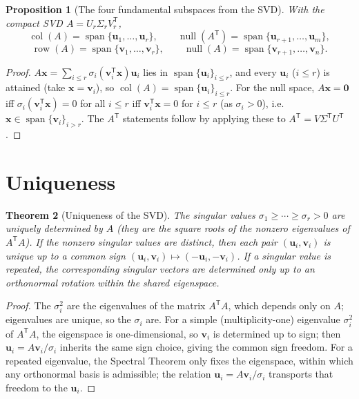 \documentclass[11pt,oneside]{book}
\theoremstyle{plain}
\newtheorem{theorem}{Theorem}[chapter]
\newtheorem{proposition}[theorem]{Proposition}
\theoremstyle{definition}
\theoremstyle{remark}
\newcommand{\col}{\operatorname{col}}
\newcommand{\row}{\operatorname{row}}
\newcommand{\nul}{\operatorname{null}}
\newcommand{\spn}{\operatorname{span}}
\newcommand{\T}{^{\mathsf T}}
\newcommand{\bu}{\mathbf{u}}
\newcommand{\bv}{\mathbf{v}}
\newcommand{\bx}{\mathbf{x}}
\newcommand{\bzero}{\mathbf{0}}
\begin{document}
\begin{proposition}[The four fundamental subspaces from the SVD]\label{prop:foursub}
With the compact SVD $A=U_r\Sigma_r V_r\T$,
\[
\col(A)=\spn\{\bu_1,\dots,\bu_r\},\qquad
\nul(A\T)=\spn\{\bu_{r+1},\dots,\bu_m\},
\]
\[
\row(A)=\spn\{\bv_1,\dots,\bv_r\},\qquad
\nul(A)=\spn\{\bv_{r+1},\dots,\bv_n\}.
\]
\end{proposition}
\begin{proof}
$A\bx=\sum_{i\le r}\sigma_i(\bv_i\T\bx)\bu_i$ lies in $\spn\{\bu_i\}_{i\le r}$, and every
$\bu_i$ ($i\le r$) is attained (take $\bx=\bv_i$), so $\col(A)=\spn\{\bu_i\}_{i\le r}$.
For the null space, $A\bx=\bzero$ iff $\sigma_i(\bv_i\T\bx)=0$ for all $i\le r$ iff
$\bv_i\T\bx=0$ for $i\le r$ (as $\sigma_i>0$), i.e.\ $\bx\in\spn\{\bv_i\}_{i>r}$. The
$A\T$ statements follow by applying these to $A\T=V\Sigma\T U\T$.
\end{proof}

\section{Uniqueness}

\begin{theorem}[Uniqueness of the SVD]\label{thm:svduniq}
The singular values $\sigma_1\ge\cdots\ge\sigma_r>0$ are uniquely determined by $A$
(they are the square roots of the nonzero eigenvalues of $A\T A$). If the nonzero
singular values are \emph{distinct}, then each pair $(\bu_i,\bv_i)$ is unique up to a
common sign $(\bu_i,\bv_i)\mapsto(-\bu_i,-\bv_i)$. If a singular value is repeated, the
corresponding singular vectors are determined only up to an orthonormal rotation within
the shared eigenspace.
\end{theorem}
\begin{proof}
The $\sigma_i^2$ are the eigenvalues of the matrix $A\T A$, which depends only on $A$;
eigenvalues are unique, so the $\sigma_i$ are. For a simple (multiplicity-one) eigenvalue
$\sigma_i^2$ of $A\T A$, the eigenspace is one-dimensional, so $\bv_i$ is determined up
to sign; then $\bu_i=A\bv_i/\sigma_i$ inherits the same sign choice, giving the common
sign freedom. For a repeated eigenvalue, the Spectral Theorem only fixes the eigenspace,
within which any orthonormal basis is admissible; the relation $\bu_i=A\bv_i/\sigma_i$
transports that freedom to the $\bu_i$.
\end{proof}
\end{document}
